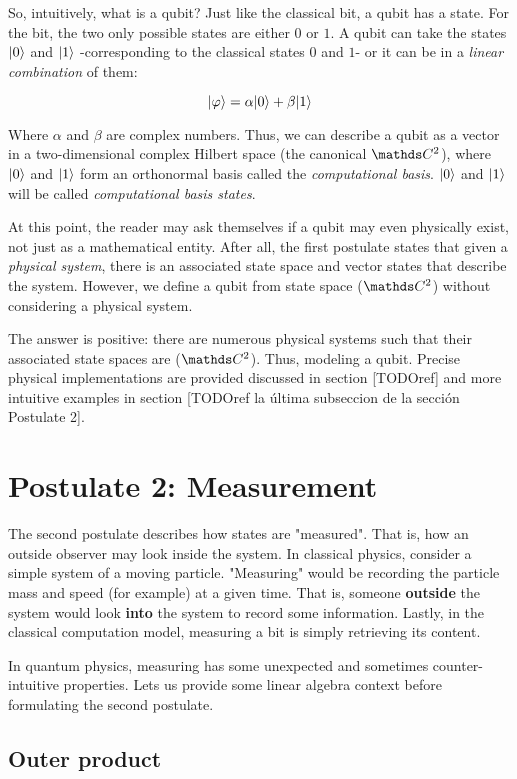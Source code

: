 So, intuitively, what is a qubit? Just like the classical bit, a qubit has a state. For the bit, the two only possible states are either $0$ or $1$. A qubit can take the states $|0\rangle$ and $|1\rangle$ -corresponding to the classical states $0$ and $1$- or it can be in a \emph{linear combination} of them:

$$ |\varphi\rangle = \alpha |0\rangle + \beta |1\rangle $$

Where $\alpha$ and $\beta$ are complex numbers. Thus, we can describe a qubit as a vector in a two-dimensional complex Hilbert space (the canonical $\C^{2}$), where $|0\rangle$ and $|1\rangle$ form an orthonormal basis called the \emph{computational basis}. $|0\rangle$ and $|1\rangle$ will be called \emph{computational basis states}.

At this point, the reader may ask themselves if a qubit may even physically exist, not just as a mathematical entity. After all, the first postulate states that given a \emph{physical system}, there is an associated state space and vector states that describe the system. However, we define a qubit from state space ($\C^{2}$) without considering a physical system. 

The answer is positive: there are numerous physical systems such that their associated state spaces are ($\C^{2}$). Thus, modeling a qubit. Precise physical implementations are provided discussed in section [TODOref] and more intuitive examples in section [TODOref la última subseccion de la sección Postulate 2].


\section{Postulate 2: Measurement}


The second postulate describes how states are "measured". That is, how an outside observer may look inside the system. In classical physics, consider a simple system of a moving particle. "Measuring" would be recording the particle mass and speed (for example) at a given time. That is, someone \textbf{outside} the system would look \textbf{into} the system to record some information. Lastly, in the classical computation model, measuring a bit is simply retrieving its content.

In quantum physics, measuring has some unexpected and sometimes counter-intuitive properties. Lets us provide some linear algebra context before formulating the second postulate.


\subsection{Outer product}


